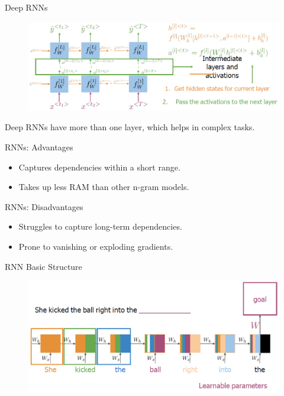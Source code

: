 \begin{frame}{Deep RNNs}
    \begin{figure}
        \centering
        \includegraphics[width=\linewidth, height=0.9\textheight,keepaspectratio]{images/nlp/deep-rnn.png}
    \end{figure}

    Deep RNNs have more than one layer, which helps in complex tasks.
\end{frame}

\begin{frame}{RNNs: Advantages}
    \begin{itemize}
        \item Captures dependencies within a short range.
        \item Takes up less RAM than other n-gram models.
    \end{itemize}
\end{frame}

\begin{frame}{RNNs: Disadvantages}
    \begin{itemize}
        \item Struggles to capture long-term dependencies.
        \item Prone to vanishing or exploding gradients.
    \end{itemize}
\end{frame}

\begin{frame}{RNN Basic Structure}
    \begin{figure}
        \centering
        \includegraphics[width=\linewidth, height=0.9\textheight,keepaspectratio]{images/nlp/rnn-basic-structure.png}
    \end{figure}
\end{frame}

